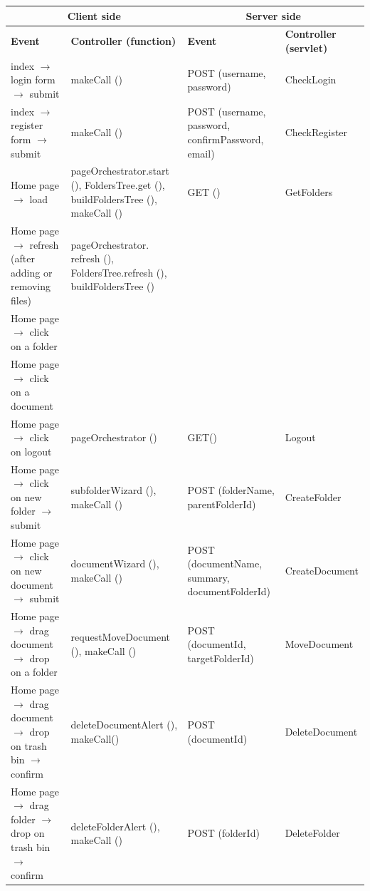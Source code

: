 \documentclass[a4paper,12pt]{article}
\begin{document}
\begin{center}
\begin{tabular}{|p{4cm}|p{4cm}|p{4cm}|p{4cm}|}
\hline

\multicolumn{2}{|c|}{\textbf{Client side}} & \multicolumn{2}{c|}{\textbf{Server side}}\\
\hline
\textbf{Event} & \textbf{Controller (function)} & \textbf{Event} & \textbf{Controller (servlet)} \\
\hline
index $\rightarrow$ login form $\rightarrow$ submit & makeCall () & POST (username, password) & CheckLogin\\
\hline
index $\rightarrow$ register form $\rightarrow$ submit & makeCall () & POST (username, password, confirmPassword, email) & CheckRegister\\
\hline
Home page $\rightarrow$ load & pageOrchestrator.start (), FoldersTree.get (), buildFoldersTree (), makeCall () & GET () & GetFolders\\
\hline
Home page $\rightarrow$ refresh (after adding or removing files) & pageOrchestrator. refresh (), FoldersTree.refresh (), buildFoldersTree () & &\\
\hline
Home page $\rightarrow$ click on a folder & & &\\ 
\hline
Home page $\rightarrow$ click on a document & & &\\
\hline
Home page $\rightarrow$  click on logout & pageOrchestrator () & GET() & Logout\\
\hline
Home page $\rightarrow$ click on new folder $\rightarrow$ submit & subfolderWizard (), makeCall () & POST (folderName, parentFolderId) & CreateFolder\\
\hline
Home page $\rightarrow$ click on new document $\rightarrow$ submit & documentWizard (), makeCall () & POST (documentName, summary, documentFolderId) & CreateDocument\\
\hline
Home page $\rightarrow$ drag document $\rightarrow$ drop on a folder & requestMoveDocument (), makeCall () & POST (documentId, targetFolderId) & MoveDocument\\
\hline
Home page $\rightarrow$ drag document $\rightarrow$ drop on trash bin $\rightarrow$ confirm & deleteDocumentAlert (), makeCall() & POST (documentId) & DeleteDocument\\
\hline
Home page $\rightarrow$ drag folder $\rightarrow$ drop on trash bin $\rightarrow$ confirm & deleteFolderAlert (), makeCall () & POST (folderId) & DeleteFolder\\
\hline

\end{tabular}
\end{center}
\end{document}
